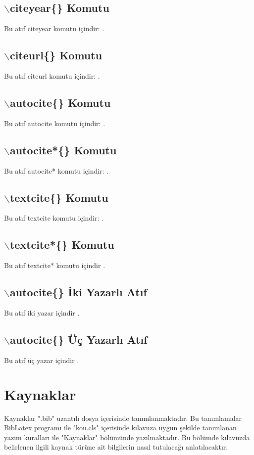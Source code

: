 \subsection{$\backslash$citeyear\{\} Komutu}
Bu atıf citeyear komutu içindir: \citeyear{tekyazarArticle}.
\subsection{$\backslash$citeurl\{\} Komutu}
Bu atıf citeurl komutu içindir: .
\subsection{$\backslash$autocite\{\} Komutu}
Bu atıf autocite komutu içindir: \autocite{tekyazarArticle}.
\subsection{$\backslash$autocite*\{\} Komutu}
Bu atıf autocite* komutu içindir: \autocite*{tekyazarArticle2}.
\subsection{$\backslash$textcite\{\} Komutu}
Bu atıf textcite komutu içindir: \textcite{tekyazarArticle}.
\subsection{$\backslash$textcite*\{\} Komutu}
Bu atıf textcite* komutu içindir \textcite*{tekyazarArticle2}.
\subsection{$\backslash$autocite\{\} İki Yazarlı Atıf}
Bu atıf iki yazar içindir \autocite{ikiyazarArticle}.
\subsection{$\backslash$autocite\{\} Üç Yazarlı Atıf}
Bu atıf üç yazar içindir \autocite{ucyazarArticle}.

\section{Kaynaklar}
Kaynaklar ".bib" uzantılı dosya içerisinde tanımlanmaktadır. Bu tanımlamalar BibLatex programı ile "kou.cls" içerisinde kılavuza uygun şekilde tanımlanan yazım kuralları ile "Kaynaklar" bölümünde yazılmaktadır. Bu bölümde kılavuzda belirlenen ilgili kaynak türüne ait bilgilerin nasıl tutulacağı anlatılacaktır. 

